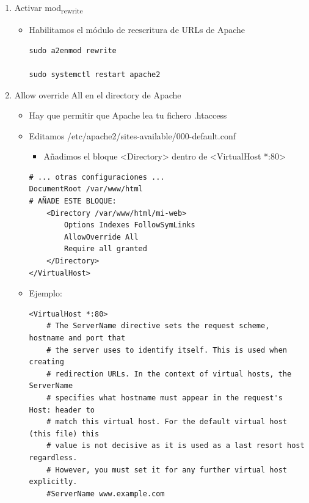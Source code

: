 \documentclass[11pt]{article}
\begin{document}
\begin{enumerate}
\begin{itemize}
\begin{quote}
\emph{picante} es la ruta donde está instalado el wordpress sería \emph{var/www/html/picante}
\end{quote}
\end{itemize}

\item Activar mod\textsubscript{rewrite}

\begin{itemize}
\item Habilitamos el módulo de reescritura de URLs de Apache

\begin{verbatim}
sudo a2enmod rewrite

sudo systemctl restart apache2
\end{verbatim}
\end{itemize}

\item Allow override All en el directory de Apache

\begin{itemize}
\item Hay que permitir que Apache lea tu fichero .htaccess

\item Editamos /etc/apache2/sites-available/000-default.conf

\begin{itemize}
\item Añadimos el bloque <Directory> dentro de <VirtualHost *:80>
\end{itemize}

\begin{verbatim}
# ... otras configuraciones ...
DocumentRoot /var/www/html
# AÑADE ESTE BLOQUE:
    <Directory /var/www/html/mi-web>
        Options Indexes FollowSymLinks
        AllowOverride All
        Require all granted
    </Directory>
</VirtualHost>
\end{verbatim}

\item Ejemplo:
\begin{verbatim}
<VirtualHost *:80>
	# The ServerName directive sets the request scheme, hostname and port that
	# the server uses to identify itself. This is used when creating
	# redirection URLs. In the context of virtual hosts, the ServerName
	# specifies what hostname must appear in the request's Host: header to
	# match this virtual host. For the default virtual host (this file) this
	# value is not decisive as it is used as a last resort host regardless.
	# However, you must set it for any further virtual host explicitly.
	#ServerName www.example.com


\end{verbatim}
\end{itemize}
\end{enumerate}
\end{document}
